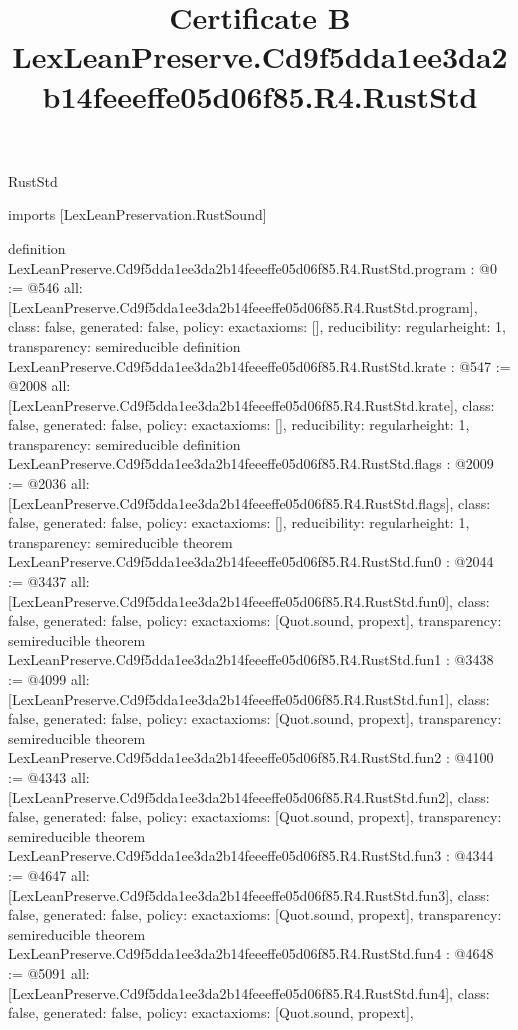 \begin{lexlean}{RustStd}
\title{Certificate B LexLeanPreserve.Cd9f5dda1ee3da2b14feeeffe05d06f85.R4.RustStd}
\begin{coremodule}
imports [LexLeanPreservation.RustSound]

definition LexLeanPreserve.Cd9f5dda1ee3da2b14feeeffe05d06f85.R4.RustStd.program : @0 := @546 {
  all: [LexLeanPreserve.Cd9f5dda1ee3da2b14feeeffe05d06f85.R4.RustStd.program],
  class: false,
  generated: false,
  policy: exact{axioms: []},
  reducibility: regular{height: 1},
  transparency: semireducible
}
definition LexLeanPreserve.Cd9f5dda1ee3da2b14feeeffe05d06f85.R4.RustStd.krate : @547 := @2008 {
  all: [LexLeanPreserve.Cd9f5dda1ee3da2b14feeeffe05d06f85.R4.RustStd.krate],
  class: false,
  generated: false,
  policy: exact{axioms: []},
  reducibility: regular{height: 1},
  transparency: semireducible
}
definition LexLeanPreserve.Cd9f5dda1ee3da2b14feeeffe05d06f85.R4.RustStd.flags : @2009 := @2036 {
  all: [LexLeanPreserve.Cd9f5dda1ee3da2b14feeeffe05d06f85.R4.RustStd.flags],
  class: false,
  generated: false,
  policy: exact{axioms: []},
  reducibility: regular{height: 1},
  transparency: semireducible
}
theorem LexLeanPreserve.Cd9f5dda1ee3da2b14feeeffe05d06f85.R4.RustStd.fun0 : @2044 := @3437 {
  all: [LexLeanPreserve.Cd9f5dda1ee3da2b14feeeffe05d06f85.R4.RustStd.fun0],
  class: false,
  generated: false,
  policy: exact{axioms: [Quot.sound, propext]},
  transparency: semireducible
}
theorem LexLeanPreserve.Cd9f5dda1ee3da2b14feeeffe05d06f85.R4.RustStd.fun1 : @3438 := @4099 {
  all: [LexLeanPreserve.Cd9f5dda1ee3da2b14feeeffe05d06f85.R4.RustStd.fun1],
  class: false,
  generated: false,
  policy: exact{axioms: [Quot.sound, propext]},
  transparency: semireducible
}
theorem LexLeanPreserve.Cd9f5dda1ee3da2b14feeeffe05d06f85.R4.RustStd.fun2 : @4100 := @4343 {
  all: [LexLeanPreserve.Cd9f5dda1ee3da2b14feeeffe05d06f85.R4.RustStd.fun2],
  class: false,
  generated: false,
  policy: exact{axioms: [Quot.sound, propext]},
  transparency: semireducible
}
theorem LexLeanPreserve.Cd9f5dda1ee3da2b14feeeffe05d06f85.R4.RustStd.fun3 : @4344 := @4647 {
  all: [LexLeanPreserve.Cd9f5dda1ee3da2b14feeeffe05d06f85.R4.RustStd.fun3],
  class: false,
  generated: false,
  policy: exact{axioms: [Quot.sound, propext]},
  transparency: semireducible
}
theorem LexLeanPreserve.Cd9f5dda1ee3da2b14feeeffe05d06f85.R4.RustStd.fun4 : @4648 := @5091 {
  all: [LexLeanPreserve.Cd9f5dda1ee3da2b14feeeffe05d06f85.R4.RustStd.fun4],
  class: false,
  generated: false,
  policy: exact{axioms: [Quot.sound, propext]},
}
\end{coremodule}
\end{lexlean}
